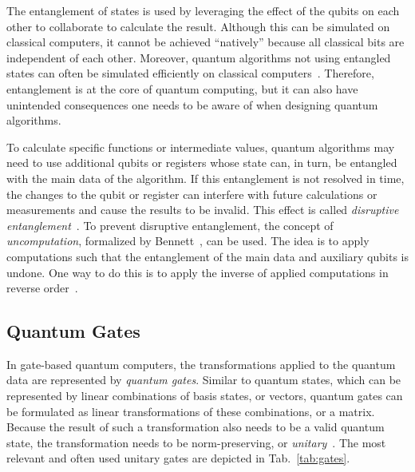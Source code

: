 The entanglement of states is used by leveraging the effect of the qubits on each other to collaborate to calculate the result. Although this can be simulated on classical computers, it cannot be achieved ``natively'' because all classical bits are independent of each other. Moreover, quantum algorithms not using entangled states can often be simulated efficiently on classical computers~\cite{MHH19}. Therefore, entanglement is at the core of quantum computing, but it can also have unintended consequences one needs to be aware of when designing quantum algorithms.

To calculate specific functions or intermediate values, quantum algorithms may need to use additional qubits or registers whose state can, in turn, be entangled with the main data of the algorithm. If this entanglement is not resolved in time, the changes to the qubit or register can interfere with future calculations or measurements and cause the results to be invalid. This effect is called \emph{disruptive entanglement}~\cite{YVC24}.
To prevent disruptive entanglement, the concept of \emph{uncomputation}, formalized by Bennett~\cite{Benn73}, can be used. The idea is to apply computations such that the entanglement of the main data and auxiliary qubits is undone. One way to do this is to apply the inverse of applied computations in reverse order~\cite{DiCh20}.

\subsection{Quantum Gates}
\label{sec:background_quantumGates}
In gate-based quantum computers, the transformations applied to the quantum data are represented by \emph{quantum gates}. Similar to quantum states, which can be represented by linear combinations of basis states, or vectors, quantum gates can be formulated as linear transformations of these combinations, or a matrix. Because the result of such a transformation also needs to be a valid quantum state, the transformation needs to be norm-preserving, or \emph{unitary}~\cite{DiCh20a}. The most relevant and often used unitary gates are depicted in Tab.~\ref{tab:gates}.

